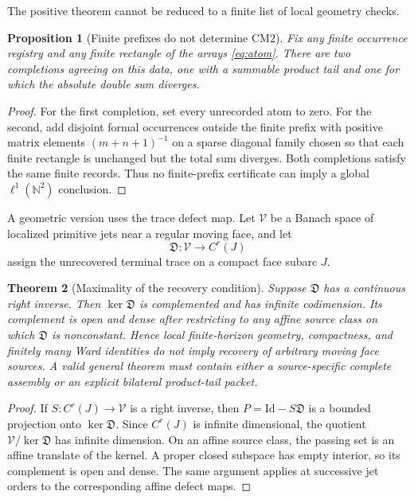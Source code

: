 \documentclass[11pt,reqno]{amsart}
\newtheorem{theorem}{Theorem}[section]
\newtheorem{proposition}[theorem]{Proposition}
\theoremstyle{definition}
\theoremstyle{remark}
\newcommand{\N}{\mathbb N}
\newcommand{\Id}{\mathrm{Id}}
\begin{document}
The positive theorem cannot be reduced to a finite list of local geometry
checks.

\begin{proposition}[Finite prefixes do not determine CM2]\label{prop:prefix}
Fix any finite occurrence registry and any finite rectangle of the arrays
\eqref{eq:atom}.  There are two completions agreeing on this data, one with a
summable product tail and one for which the absolute double sum diverges.
\end{proposition}

\begin{proof}
For the first completion, set every unrecorded atom to zero.  For the second,
add disjoint formal occurrences outside the finite prefix with positive matrix
elements $(m+n+1)^{-1}$ on a sparse diagonal family chosen so that each finite
rectangle is unchanged but the total sum diverges.  Both completions satisfy
the same finite records.  Thus no finite-prefix certificate can imply a global
$\ell^1(\N^2)$ conclusion.
\end{proof}

A geometric version uses the trace defect map.  Let $\mathcal V$ be a Banach
space of localized primitive jets near a regular moving face, and let
\[
 \mathfrak D:\mathcal V\to C^r(J)
\]
assign the unrecovered terminal trace on a compact face subarc $J$.

\begin{theorem}[Maximality of the recovery condition]\label{thm:maximality}
Suppose $\mathfrak D$ has a continuous right inverse.  Then
$\ker\mathfrak D$ is complemented and has infinite codimension.  Its complement
is open and dense after restricting to any affine source class on which
$\mathfrak D$ is nonconstant.  Hence local finite-horizon geometry, compactness,
and finitely many Ward identities do not imply recovery of arbitrary moving
face sources.  A valid general theorem must contain either a source-specific
complete assembly or an explicit bilateral product-tail packet.
\end{theorem}

\begin{proof}
If $S:C^r(J)\to\mathcal V$ is a right inverse, then
$P=\Id-S\mathfrak D$ is a bounded projection onto $\ker\mathfrak D$.  Since
$C^r(J)$ is infinite dimensional, the quotient
$\mathcal V/\ker\mathfrak D$ has infinite dimension.  On an affine source
class, the passing set is an affine translate of the kernel.  A proper closed
subspace has empty interior, so its complement is open and dense.  The same
argument applies at successive jet orders to the corresponding affine defect
maps.
\end{proof}
\end{document}
